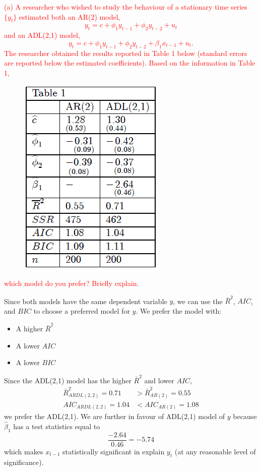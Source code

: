 \documentclass[12pt]{report}
\begin{document}
\noindent \textcolor{red}{(a) A researcher who wished to study the behaviour of a stationary time series $\{y_t\}$ estimated both an AR(2) model, $$y_t = c + \phi_1 y_{t-1} + \phi_2 y_{t-2} + u_t$$ and an ADL(2,1) model, $$y_t = c + \phi_1 y_{t-1} + \phi_2 y_{t-2} + \beta_1 x_{t-1} + u_t.$$ The researcher obtained the results reported in Table 1 below (standard errors are reported below the estimated coefficients). Based on the information in Table 1, \begin{figure}[H]
		\centerline{\includegraphics{tute12_1}}
	\end{figure}
	\vspace{-\baselineskip} \noindent which model do you prefer? Briefly explain.}

\noindent Since both models have the same dependent variable $y$, we can use the $\bar{R}^2$, $AIC$, and $BIC$ to choose a preferred model for $y$. We prefer the model with:
\begin{itemize}\vspace{-\baselineskip}
	\item A higher $\bar{R}^2$
	\item A lower $AIC$
	\item A lower $BIC$
\end{itemize}\vspace{-\baselineskip} \noindent Since the ADL(2,1) model has the higher $\bar{R}^2$ and lower $AIC$, \begin{align*}
	\bar{R}^2_{ARDL(2,2)} = 0.71 &> \bar{R}^2_{AR(2)} = 0.55 \\
	AIC_{ARDL(2,2)} = 1.04 &< AIC_{AR(2)} = 1.08
\end{align*} we prefer the ADL(2,1). We are further in favour of ADL(2,1) model of $y$ because $\hat{\beta}_1$ has a test statistics equal to $$\dfrac{-2.64}{0.46} = -5.74$$ which makes $x_{t-1}$ statistically significant in explain $y_t$ (at any reasonable level of significance).
\end{document}
